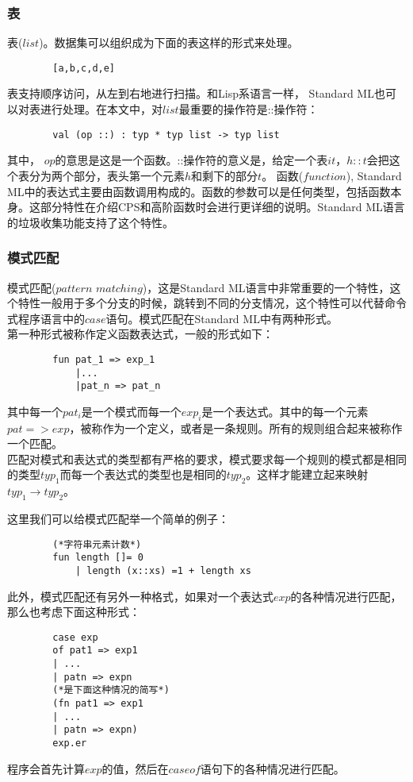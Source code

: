 \documentclass[openany,oneside]{book}
\theoremstyle{definition}
\theoremstyle{definition}
\begin{document}
	\subsubsection{表}
	\indent 表(\(list\))。数据集可以组织成为下面的表这样的形式来处理。
	\begin{lstlisting}
		[a,b,c,d,e]
	\end{lstlisting}
	表支持顺序访问，从左到右地进行扫描。和Lisp系语言一样， Standard ML也可以对表进行处理。在本文中，对\(list\)最重要的操作符是::操作符：
	\begin{lstlisting}
		val (op ::) : typ * typ list -> typ list		
	\end{lstlisting}
	其中， \(op\)的意思是这是一个函数。::操作符的意义是，给定一个表\(it\)，\(h::t\)会把这个表分为两个部分，表头第一个元素$h$和剩下的部分$t$。	
	\indent 函数(\(function\)), Standard ML中的表达式主要由函数调用构成的。函数的参数可以是任何类型，包括函数本身。这部分特性在介绍CPS和高阶函数时会进行更详细的说明。Standard ML语言的垃圾收集功能\cite{paulson1996ml-5}支持了这个特性。\\
	\subsubsection{模式匹配}
	\indent 模式匹配(\(pattern\) \(matching\))，这是Standard ML语言中非常重要的一个特性，这个特性一般用于多个分支的时候，跳转到不同的分支情况，这个特性可以代替命令式程序语言中的\(case\)语句。模式匹配在Standard ML中有两种形式。\\
	\indent 第一种形式被称作定义函数表达式，一般的形式如下：
	\begin{lstlisting}
		fun pat_1 => exp_1
			|...
			|pat_n => pat_n
	\end{lstlisting}
	其中每一个\(pat_i\)是一个模式而每一个\(exp_i\)是一个表达式。其中的每一个元素 \( pat => exp\)，被称作为一个定义，或者是一条规则。所有的规则组合起来被称作一个匹配。\\
	\indent 匹配对模式和表达式的类型都有严格的要求，模式要求每一个规则的模式都是相同的类型\(typ_1\)而每一个表达式的类型也是相同的\(typ_2\)。这样才能建立起来映射\(typ_1 \rightarrow typ_2\)。
	
	这里我们可以给模式匹配举一个简单的例子：
	\begin{lstlisting}
		(*字符串元素计数*)
		fun length []= 0
			| length (x::xs) =1 + length xs
	\end{lstlisting}
	
	此外，模式匹配还有另外一种格式，如果对一个表达式\(exp\)的各种情况进行匹配，那么也考虑下面这种形式：
	\begin{lstlisting}
		case exp
		of pat1 => exp1
		| ...
		| patn => expn
		(*是下面这种情况的简写*)
		(fn pat1 => exp1
		| ...
		| patn => expn)
		exp.er
	\end{lstlisting}
	程序会首先计算\(exp\)的值，然后在\(case\)\(of\)语句下的各种情况进行匹配。
\end{document}
